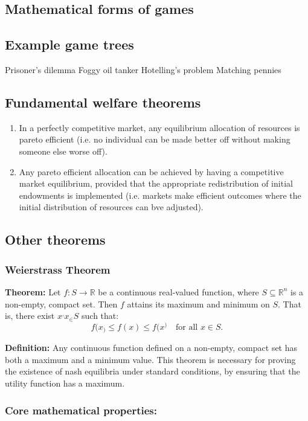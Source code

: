 \documentclass{article}
\begin{document}
\subsection{Mathematical forms of games}

\subsection{Example game trees}
Prisoner's dilemma 
Foggy oil tanker 
Hotelling's problem 
Matching pennies 

\subsection{Fundamental welfare theorems}
\begin{enumerate}
    \item In a perfectly competitive market, any equilibrium allocation of resources is pareto efficient (i.e. no individual can be made better off without making someone else worse off).
    \item Any pareto efficient allocation can be achieved by having a competitive market equilibrium, provided that the appropriate redistribution of initial endowments is implemented (i.e. markets make efficient outcomes where the initial distribution of resources can bve adjusted). 
\end{enumerate}


\subsection{Other theorems}
\subsubsection{Weierstrass Theorem}\label{weiss}
\textbf{Theorem:} Let \(f: S \to \mathbb{R}\) be a continuous real-valued function, where \(S \subseteq \mathbb{R}^n\) is a non-empty, compact set. Then \(f\) attains its maximum and minimum on \(S\). That is, there exist \(x^, x_ \in S\) such that:
\[
f(x_) \leq f(x) \leq f(x^) \quad \text{for all } x \in S.
\]

\textbf{Definition:} Any continuous function defined on a non-empty, compact set has both a maximum and a minimum value. This theorem is necessary for proving the existence of nash equilibria under standard conditions, by ensuring that the utility function has a maximum. 

\subsubsection{Core mathematical properties:}
\end{document}
